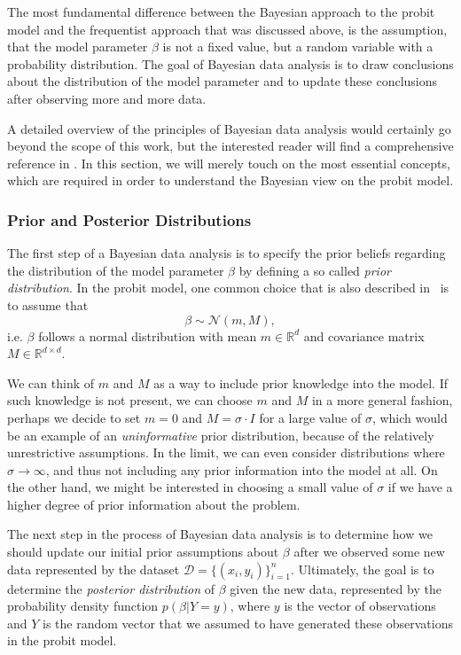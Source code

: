 The most fundamental difference between the Bayesian approach to
the probit model and the frequentist approach that was discussed above,
is the assumption, that the model parameter $\beta$ is not a fixed
value, but a random variable with a probability distribution.
The goal of Bayesian data analysis is to draw conclusions about
the distribution of the model parameter and to update these
conclusions after observing more and more data.

A detailed overview of the principles of Bayesian data
analysis would certainly go beyond the scope of this work,
but the interested reader will find a comprehensive reference
in \cite{bayes-gelman}.
In this section, we will merely touch on the most essential concepts,
which are required in order to understand the Bayesian view on the
probit model.

\subsubsection{Prior and Posterior Distributions}

The first step of a Bayesian data analysis is to specify the
prior beliefs regarding the distribution of the model
parameter $\beta$ by defining a so called \textit{prior distribution}.
In the probit model, one common choice that is also described
in~\cite{regression-fahrmeir} is to assume that
\begin{equation}
    \beta \sim \mathcal{N}(m, M),
\end{equation}
i.e. $\beta$ follows a normal distribution with mean
$m \in \mathbb{R}^d$ and
covariance matrix $M \in \mathbb{R}^{d \times d}$.

We can think of $m$ and $M$ as a way to
include prior knowledge into the model.
If such knowledge is not present, we can choose $m$ and
$M$ in a more general fashion, perhaps we decide
to set $m = 0$ and $M = \sigma \cdot I$
for a large value of $\sigma$, which would
be an example of an \textit{uninformative} prior distribution,
because of the relatively unrestrictive assumptions.
In the limit, we can even consider distributions where
$\sigma \rightarrow \infty$, and thus not including any prior
information into the model at all.
On the other hand, we might be interested in choosing a
small value of $\sigma$ if we have a higher degree of
prior information about the problem.

The next step in the process of Bayesian data analysis
is to determine how we should update our initial prior
assumptions about $\beta$ after we observed some new data
represented by the dataset $\mathcal{D} = \{(x_i, y_i)\}_{i=1}^n$.
Ultimately, the goal is to determine the
\textit{posterior distribution} of $\beta$ given the new data,
represented by the probability density function
$p(\beta | Y=y)$, where $y$ is the
vector of observations and $Y$ is the random vector that we
assumed to have generated these observations in the probit model.


